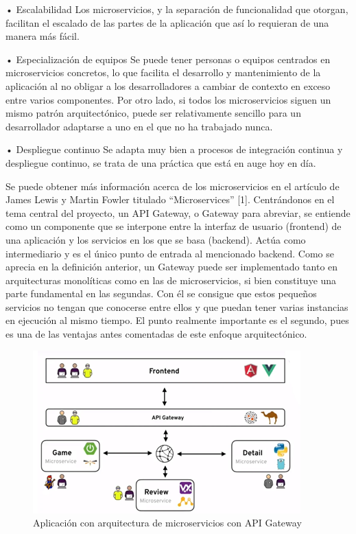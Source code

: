 \documentclass[11pt,spanish,listoffigures]{tfgetsinf}
\begin{document}
•	Escalabilidad
Los microservicios, y la separación de funcionalidad que otorgan, facilitan el escalado de las partes de la aplicación que así lo requieran de una manera más fácil.

•	Especialización de equipos
Se puede tener personas o equipos centrados en microservicios concretos, lo que facilita el desarrollo y mantenimiento de la aplicación al no obligar a los desarrolladores a cambiar de contexto en exceso entre varios componentes. Por otro lado, si todos los microservicios siguen un mismo patrón arquitectónico, puede ser relativamente sencillo para un desarrollador adaptarse a uno en el que no ha trabajado nunca.

•	Despliegue continuo
Se adapta muy bien a procesos de integración continua y despliegue continuo, se trata de una práctica que está en auge hoy en día.

Se puede obtener más información acerca de los microservicios en el artículo de James Lewis y Martin Fowler titulado “Microservices” [1].
Centrándonos en el tema central del proyecto, un API Gateway, o Gateway para abreviar, se entiende como un componente que se interpone entre la interfaz de usuario (frontend) de una aplicación y los servicios en los que se basa (backend). Actúa como intermediario y es el único punto de entrada al mencionado backend.
Como se aprecia en la definición anterior, un Gateway puede ser implementado tanto en arquitecturas monolíticas como en las de microservicios, si bien constituye una parte fundamental en las segundas. Con él se consigue que estos pequeños servicios no tengan que conocerse entre ellos y que puedan tener varias instancias en ejecución al mismo tiempo. El punto realmente importante es el segundo, pues es una de las ventajas antes comentadas de este enfoque arquitectónico.

\begin{figure}
	\centering
	\includegraphics{images/b}
	\caption{Aplicación con arquitectura de microservicios con API Gateway}
\end{figure}
\end{document}
